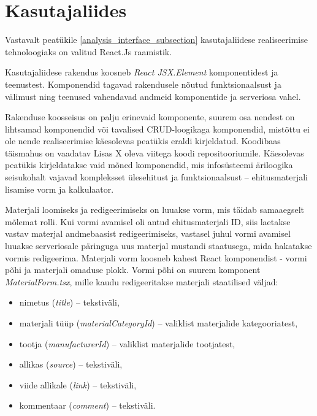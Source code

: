 \section{Kasutajaliides}
Vastavalt peatükile \ref{analysis_interface_subsection} kasutajaliidese realiseerimise tehnoloogiaks
on valitud React.Js raamistik.

Kasutajaliidese rakendus koosneb \textit{React JSX.Element} komponentidest ja teenustest.
Komponendid tagavad rakendusele nõutud funktsionaalsust ja välimust ning teenused vahendavad andmeid komponentide 
ja serveriosa vahel.

Rakenduse koosseisus on palju erinevaid komponente, suurem osa nendest on lihtsamad komponendid või tavalised
CRUD-loogikaga komponendid, mistõttu ei ole nende realiseerimise käesolevas peatükis eraldi kirjeldatud. Koodibaas
täismahus on vaadatav  Lisas X oleva viitega koodi repositooriumile. Käesolevas peatükis kirjeldatakse vaid mõned
komponendid, mis infosüsteemi äriloogika seisukohalt vajavad kompleksset ülesehitust ja funktsionaalsust -- 
ehitusmaterjali lisamise vorm ja kalkulaator.

Materjali loomiseks ja redigeerimiseks on luuakse vorm, mis täidab samaaegselt mõlemat rolli.
Kui vormi avamisel oli antud ehitusmaterjali ID, siis laetakse vastav materjal andmebaasist redigeerimiseks, 
vastasel juhul vormi avamisel luuakse serveriosale päringuga uus materjal mustandi staatusega, mida hakatakse
vormis redigeerima. Materjali vorm koosneb kahest React komponendist - vormi põhi ja materjali omaduse plokk.
Vormi põhi on suurem komponent \textit{MaterialForm.tsx}, mille kaudu redigeeritakse materjali staatilised 
väljad:

\begin{itemize}
    \item nimetus (\textit{title}) -- tekstiväli,
    \item materjali tüüp (\textit{materialCategoryId}) -- valiklist materjalide kategooriatest, 
    \item tootja (\textit{manufacturerId}) -- valiklist materjalide tootjatest,
    \item allikas (\textit{source}) -- tekstiväli,
    \item viide allikale (\textit{link}) -- tekstiväli,
    \item kommentaar (\textit{comment}) -- tekstiväli.
\end{itemize}

